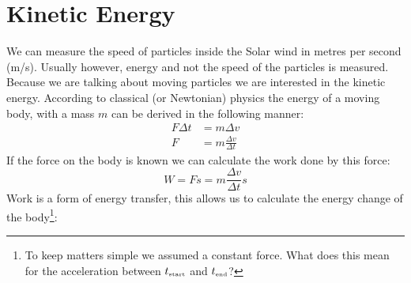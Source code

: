 \section{Kinetic Energy}
We can measure the speed of particles inside the Solar wind in metres per second (m/s). Usually however, energy and not the speed of the particles is measured. Because we are talking about moving particles we are interested in the kinetic energy. According to classical (or Newtonian) physics the energy of a moving body, with a mass $m$ can be derived in the following manner:
\begin{align}
F \Delta t &= m \Delta v \\
F &= m \frac{\Delta v}{\Delta t}
\end{align}
If the force on the body is known we can calculate the work done by this force:
\begin{equation}
W = Fs = m \frac{\Delta v}{\Delta t} s
\end{equation}
Work is a form of energy transfer, this allows us to calculate the energy change of the body\footnote{To keep matters simple we assumed a constant force. What does this mean for the acceleration between $t_{\mbox{\begin{tiny}start\end{tiny}}}$ and $t_{\mbox{\begin{tiny}end\end{tiny}}}$?}:
